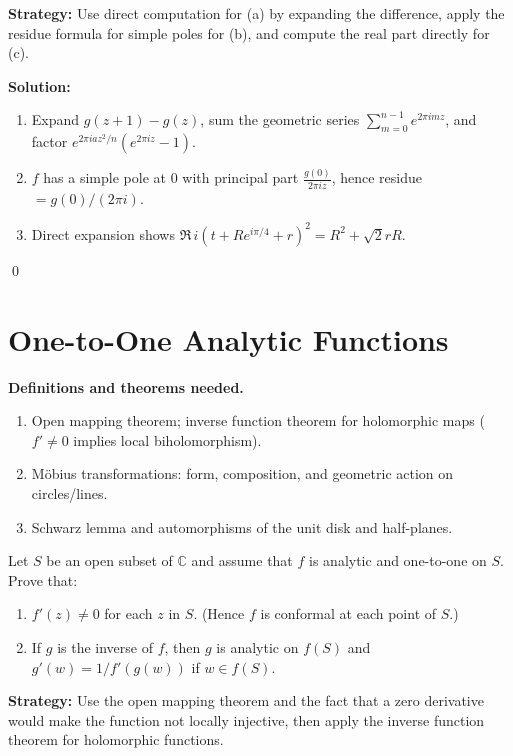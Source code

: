 \noindent\textbf{Strategy:} Use direct computation for (a) by expanding the difference, apply the residue formula for simple poles for (b), and compute the real part directly for (c).

\bigskip\noindent\textbf{Solution:}
\begin{enumerate}[label=(\alph*)]
\item Expand $g(z+1)-g(z)$, sum the geometric series $\sum_{m=0}^{n-1}e^{2\pi i m z}$, and factor $e^{2\pi i a z^2/n}(e^{2\pi i z}-1)$.
\item $f$ has a simple pole at $0$ with principal part $\frac{g(0)}{2\pi i z}$, hence residue $=g(0)/(2\pi i)$.
\item Direct expansion shows $\Re\,i(t+Re^{i\pi/4}+r)^2=R^2+\sqrt2 rR$.
\end{enumerate}\qed
\section{One-to-One Analytic Functions}

\noindent\textbf{Definitions and theorems needed.}
\begin{enumerate}[label=(\alph*)]
\item Open mapping theorem; inverse function theorem for holomorphic maps ($f'\ne0$ implies local biholomorphism).
\item Möbius transformations: form, composition, and geometric action on circles/lines.
\item Schwarz lemma and automorphisms of the unit disk and half-planes.
\end{enumerate}



\begin{problembox}
Let \( S \) be an open subset of \( \mathbb{C} \) and assume that \( f \) is analytic and one-to-one on \( S \). Prove that:
\begin{enumerate}[label=(\alph*)]
\item \( f'(z) \neq 0 \) for each \( z \) in \( S \). (Hence \( f \) is conformal at each point of \( S \).)
\item If \( g \) is the inverse of \( f \), then \( g \) is analytic on \( f(S) \) and \( g'(w) = 1 / f'(g(w)) \) if \( w \in f(S) \).
\end{enumerate}
\end{problembox}

\noindent\textbf{Strategy:} Use the open mapping theorem and the fact that a zero derivative would make the function not locally injective, then apply the inverse function theorem for holomorphic functions.

